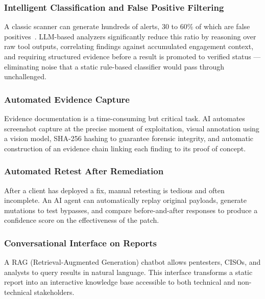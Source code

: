 \documentclass[12pt,a4paper]{report}
\begin{document}
\subsubsection{Intelligent Classification and False Positive Filtering}

A classic scanner can generate hundreds of alerts, 30 to 60\% of which are false
positives~\cite{threatexploitFP}. LLM-based analyzers significantly reduce this
ratio by reasoning over raw tool outputs, correlating findings against accumulated
engagement context, and requiring structured evidence before a result is promoted
to verified status --- eliminating noise that a static rule-based classifier would
pass through unchallenged.

\subsubsection{Automated Evidence Capture}

Evidence documentation is a time-consuming but critical task. AI automates
screenshot capture at the precise moment of exploitation, visual annotation using
a vision model, SHA-256 hashing to guarantee forensic integrity, and automatic
construction of an evidence chain linking each finding to its proof of concept.

\subsubsection{Automated Retest After Remediation}

After a client has deployed a fix, manual retesting is tedious and often incomplete.
An AI agent can automatically replay original payloads, generate mutations to test
bypasses, and compare before-and-after responses to produce a confidence score on
the effectiveness of the patch.

\subsubsection{Conversational Interface on Reports}

A RAG (Retrieval-Augmented Generation) chatbot allows pentesters, CISOs, and
analysts to query results in natural language. This interface transforms a static
report into an interactive knowledge base accessible to both technical and
non-technical stakeholders.
\end{document}
